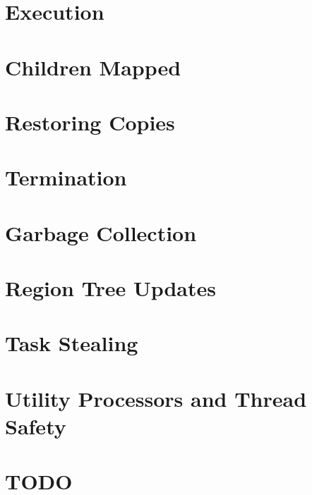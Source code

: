\section{Execution}

\section{Children Mapped}

\section{Restoring Copies}

\section{Termination}

\section{Garbage Collection}

\section{Region Tree Updates}

\section{Task Stealing}

\section{Utility Processors and Thread Safety}

\section{TODO}



